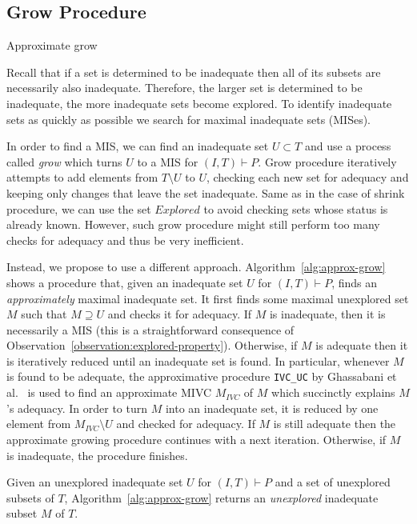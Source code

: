  



\subsection{Grow Procedure}
\begin{algorithm}[!t]
\label{alg:approx-grow}

\caption{Approximate grow}
\end{algorithm}

Recall that if a set is determined to be inadequate then all of its subsets are necessarily also inadequate. Therefore, the larger set is determined to be inadequate, the more inadequate sets become explored.  %
To identify inadequate sets as quickly as possible we search for maximal inadequate sets (MISes).  

In order to find a MIS, we can find an inadequate set $U \subset T$ and use a process called \emph{grow} which turns $U$ to a MIS for $(I,T) \vdash P$.
Grow procedure iteratively attempts to add elements from $T \setminus U$ to $U$, checking each new set for adequacy and keeping only changes that leave the set inadequate. Same as in the case of shrink procedure, we can use the set $Explored$ to avoid checking sets whose status is already known.
However, such grow procedure might still perform too many checks for adequacy and thus be very inefficient. 


Instead, we propose to use a different approach. Algorithm~\ref{alg:approx-grow} shows a procedure that, given an inadequate set $U$ for $(I, T) \vdash P$, finds an \emph{approximately} maximal inadequate set. 
It first finds some maximal unexplored set $M$ such that $M \supseteq U$ and checks it for adequacy. 
If $M$ is inadequate, then it is necessarily a MIS
(this is a straightforward consequence of Observation~\ref{observation:explored-property}). 
Otherwise, if $M$ is adequate then it is iteratively reduced until an inadequate set is found.
In particular, whenever $M$ is found to be adequate, the approximative procedure \texttt{IVC\_UC} by Ghassabani et al.~\cite{single-mivc} is used to find an approximate MIVC $M_{IVC}$ of $M$ which succinctly explains $M$'s adequacy. In order to turn $M$ into an inadequate set, it is reduced by one element from $M_{IVC} \setminus U$ and checked for adequacy. If $M$ is still adequate then the approximate growing procedure continues with a next iteration. Otherwise, if $M$ is inadequate, the procedure finishes.

\begin{proposition}
Given an unexplored inadequate set $U$ for $(I,T) \vdash P$ and a set of unexplored subsets of $T$, Algorithm~\ref{alg:approx-grow} returns an \emph{unexplored} inadequate subset $M$ of $T$.
\end{proposition}

